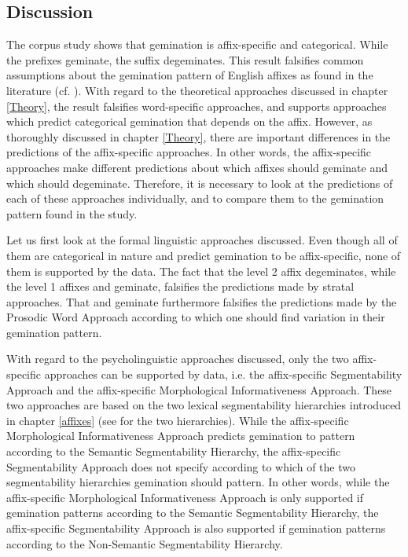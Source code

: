\subsection{Discussion}


The corpus study shows that gemination is affix-specific and categorical. While the prefixes geminate, the suffix  degeminates. 
This result falsifies common assumptions about the gemination pattern of English affixes as found in the literature (cf. ). 
With regard to the theoretical approaches discussed in chapter \ref{Theory}, the result falsifies word-specific approaches, and supports approaches which predict categorical gemination that depends on the affix. However, as thoroughly discussed in chapter \ref{Theory}, there are important differences in the predictions of the affix-specific approaches. In other words, the affix-specific approaches make different predictions about which affixes should geminate and which should degeminate. Therefore, it is necessary to look at the predictions of each of these approaches individually, and to compare them to the gemination pattern found in the study.

Let us first look at the formal linguistic approaches discussed. Even though all of them are categorical in nature and predict gemination to be affix-specific, none of them is supported by the data. The fact that the level 2 affix  degeminates, while the level 1 affixes  and  geminate, falsifies the predictions made by stratal approaches. That  and  geminate furthermore falsifies the predictions made by the Prosodic Word Approach according to which one should find variation in their gemination pattern. 

With regard to the psycholinguistic approaches discussed, only the two affix-specific approaches can be supported by data, i.e. the affix-specific Segmentability Approach and the affix-specific Morphological Informativeness Approach. 
These two approaches are based on the two lexical segmentability hierarchies introduced in chapter \ref{affixes} (see  for the two hierarchies). While the affix-specific Morphological Informativeness Approach predicts gemination to pattern according to the Semantic Segmentability Hierarchy, the affix-specific Segmentability Approach does not specify according to which of the two segmentability hierarchies gemination should pattern. In other words, while the affix-specific Morphological Informativeness Approach is only supported if gemination patterns according to the Semantic Segmentability Hierarchy, the affix-specific Segmentability Approach is also supported if gemination patterns according to the Non-Semantic Segmentability Hierarchy. 



